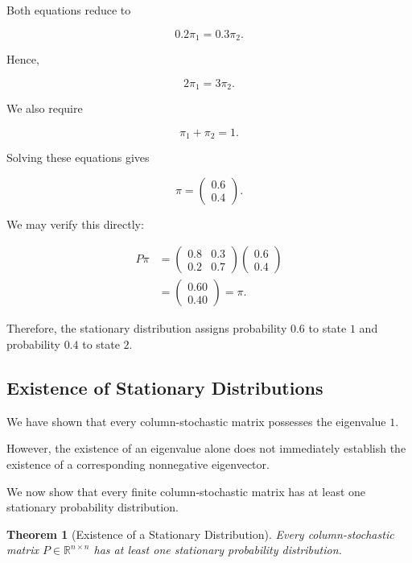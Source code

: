 \documentclass[11pt,a4paper]{article}
\newtheorem{theorem}{Theorem}[section]
\theoremstyle{definition}
\theoremstyle{remark}
\begin{document}
Both equations reduce to

\[
0.2\pi_1=0.3\pi_2.
\]

Hence,

\[
2\pi_1=3\pi_2.
\]

We also require

\[
\pi_1+\pi_2=1.
\]

Solving these equations gives

\[
\boxed{
\pi=
\begin{pmatrix}
0.6\\
0.4
\end{pmatrix}.
}
\]

We may verify this directly:

\[
\begin{aligned}
P\pi
&=
\begin{pmatrix}
0.8&0.3\\
0.2&0.7
\end{pmatrix}
\begin{pmatrix}
0.6\\
0.4
\end{pmatrix}\\
&=
\begin{pmatrix}
0.60\\
0.40
\end{pmatrix}
=\pi.
\end{aligned}
\]

Therefore, the stationary
distribution assigns
probability $0.6$ to state $1$
and probability $0.4$
to state $2$.

\subsection{Existence of Stationary Distributions}

We have shown that every
column-stochastic matrix
possesses the eigenvalue $1$.

However, the existence of
an eigenvalue alone does not
immediately establish the
existence of a corresponding
nonnegative eigenvector.

We now show that every finite
column-stochastic matrix
has at least one stationary
probability distribution.

\begin{theorem}[Existence of a Stationary Distribution]

Every column-stochastic matrix
$P\in\mathbb{R}^{n\times n}$
has at least one stationary
probability distribution.

\end{theorem}
\end{document}
